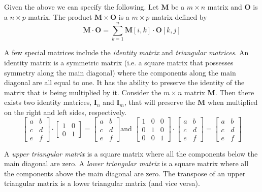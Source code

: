 \documentclass[12pt]{article}
\begin{document}
Given the above we can specify the following. Let $\mathbf{M}$ be a $m\times n$ matrix and $\mathbf{O}$ is a $n \times p$ matrix. The product $\mathbf{M}\times\mathbf{O}$ is a $m\times p$ matrix defined by
\[
\mathbf{M}\cdot\mathbf{O} = \sum_{k=1}^{n} \mathbf{M}[i,k] \cdot \mathbf{O}[k,j]
\] 

A  few special matrices include the \emph{identity matrix} and \emph{triangular matrices}. An identity matrix is a symmetric matrix (i.e. a square matrix that possesses symmetry along the main diagonal) where the components along the main diagonal are all equal to one. It has the ability to preserve the identity of the matrix that is being multiplied by it. Consider the $m\times n$ matrix $\mathbf{M}$. Then there exists two identity matrices, $\mathbf{I}_{n}$ and $\mathbf{I}_{m}$, that will preserve the $\mathbf{M}$ when multiplied on the right and left sides, respectively.
\[
\begin{bmatrix}
a & b \\
c & d \\
e & f
\end{bmatrix}
\cdot
\begin{bmatrix}
1 & 0 \\
0 & 1 
\end{bmatrix}
=
\begin{bmatrix}
a & b \\
c & d \\
e & f
\end{bmatrix}
\mbox{and\ } 
\begin{bmatrix}
1 & 0 & 0 \\
0 & 1 & 0 \\
0 & 0 & 1
\end{bmatrix}
\cdot
\begin{bmatrix}
a & b \\
c & d \\
e & f
\end{bmatrix}
=
\begin{bmatrix}
a & b \\
c & d \\
e & f
\end{bmatrix}
\]

A \emph{upper triangular matrix} is a square matrix where all the components below the main diagonal are zero. A \emph{lower triangular matrix} is a square matrix where all the components above the main diagonal are zero. The transpose of an upper triangular matrix is a lower triangular matrix (and vice versa). \\
\end{document}
